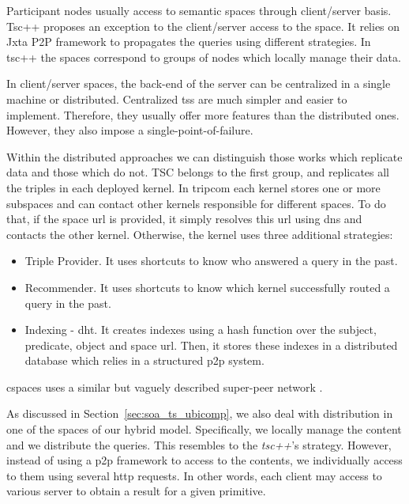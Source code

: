 Participant nodes usually access to semantic spaces through client/server basis.
Tsc++ proposes an exception to the client/server access to the space.
It relies on Jxta P2P framework to propagates the queries using different strategies.
In tsc++ the spaces correspond to groups of nodes which locally manage their data.


In client/server spaces, the back-end of the server can be centralized in a single machine or distributed.
Centralized \aclp{ts} are much simpler and easier to implement.
Therefore, they usually offer more features than the distributed ones.
However, they also impose a single-point-of-failure.


Within the distributed approaches we can distinguish those works which replicate data and those which do not.
TSC belongs to the first group, and replicates all the triples in each deployed kernel.
In \ac{tripcom} each kernel stores one or more subspaces and can contact other kernels responsible for different spaces.
To do that, if the space \ac{url} is provided, it simply resolves this \ac{url} using \ac{dns} and contacts the other kernel.
Otherwise, the kernel uses three additional strategies:
\begin{itemize}
  \item Triple Provider.
	It uses shortcuts to know who answered a query in the past.
  \item Recommender.
	It uses shortcuts to know which kernel successfully routed a query in the past.
  \item Indexing - \ac{dht}.
	It creates indexes using a hash function over the subject, predicate, object and space \ac{url}.
	Then, it stores these indexes in a distributed database which relies in a structured \ac{p2p} system. %
\end{itemize}
\ac{cspaces} uses a similar but vaguely described super-peer network \citep{martinrecuerda_application_2006}.


As discussed in Section~\ref{sec:soa_ts_ubicomp}, we also deal with distribution in one of the spaces of our hybrid model.
Specifically, we locally manage the content and we distribute the queries.
This resembles to the \emph{tsc++}'s strategy.
However, instead of using a \ac{p2p} framework to access to the contents,
we individually access to them using several \ac{http} requests. %
In other words, each client may access to various server to obtain a result for a given primitive.






